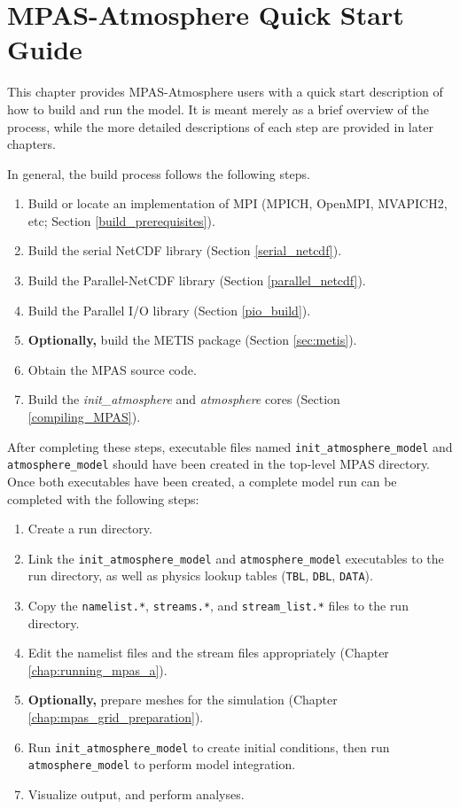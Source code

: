 \chapter{MPAS-Atmosphere Quick Start Guide}
\label{chap:quick_start}

This chapter provides MPAS-Atmosphere users with a quick start description of
how to build and run the model. It is meant merely as a brief overview of the
process, while the more detailed descriptions of each step are provided in later
chapters.

In general, the build process follows the following steps.

\begin{enumerate}
	\item Build or locate an implementation of MPI (MPICH, OpenMPI, MVAPICH2, etc; Section \ref{build_prerequisites}).
	\item Build the serial NetCDF library (Section \ref{serial_netcdf}).
	\item Build the Parallel-NetCDF library (Section \ref{parallel_netcdf}).
	\item Build the Parallel I/O library (Section \ref{pio_build}).
	\item {\bf Optionally,} build the METIS package (Section \ref{sec:metis}).
	\item Obtain the MPAS source code.
	\item Build the {\em init\_atmosphere} and {\em atmosphere} cores (Section \ref{compiling_MPAS}).
\end{enumerate}

After completing these steps, executable files named {\tt init\_atmosphere\_model} and
{\tt atmosphere\_model} should have been created in the top-level MPAS directory. Once
both executables have been created, a complete model run can be completed with the following steps:

\begin{enumerate}
	\item Create a run directory.
	\item Link the {\tt init\_atmosphere\_model} and {\tt atmosphere\_model} executables to the run directory, as well as physics lookup tables ({\tt *TBL}, {\tt *DBL}, {\tt *DATA}).
	\item Copy the {\tt namelist.*}, {\tt streams.*}, and {\tt stream\_list.*} files to the run directory. 
	\item Edit the namelist files and the stream files appropriately (Chapter \ref{chap:running_mpas_a}).
	\item {\bf Optionally,} prepare meshes for the simulation (Chapter \ref{chap:mpas_grid_preparation}).
	\item Run {\tt init\_atmosphere\_model} to create initial conditions, then run {\tt atmosphere\_model} to perform model integration.
	\item Visualize output, and perform analyses.
\end{enumerate}
